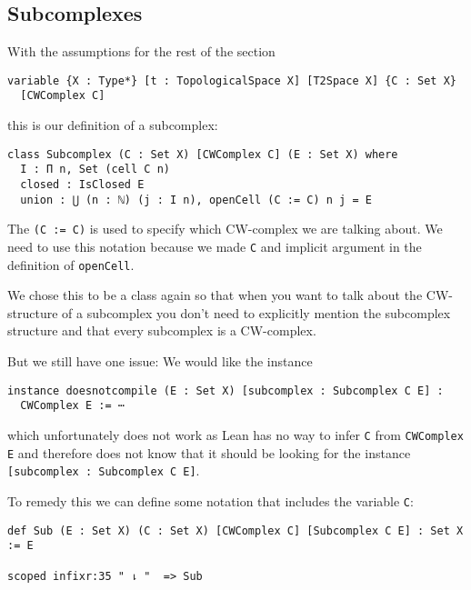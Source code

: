 \subsection{Subcomplexes}

With the assumptions for the rest of the section

\begin{lstlisting}
variable {X : Type*} [t : TopologicalSpace X] [T2Space X] {C : Set X} 
  [CWComplex C]
\end{lstlisting}

this is our definition of a subcomplex:
\href{https://github.com/scholzhannah/CWComplexes/blob/7be4872a05b534011cc969eb5b80a4b7f0bf57e2/CWcomplexes/subcomplex.lean#L44-L52}{\faExternalLink}

\begin{lstlisting}
class Subcomplex (C : Set X) [CWComplex C] (E : Set X) where
  I : Π n, Set (cell C n)
  closed : IsClosed E
  union : ⋃ (n : ℕ) (j : I n), openCell (C := C) n j = E
\end{lstlisting}

The \lstinline{(C := C)} is used to specify which CW-complex we are talking about. 
We need to use this notation because we made \lstinline{C} and implicit argument in the definition of \lstinline{openCell}.

We chose this to be a class again so that when you want to talk about the CW-structure of a subcomplex you don't need to explicitly mention the subcomplex structure and that every subcomplex is a CW-complex.

But we still have one issue: 
We would like the instance 

\begin{lstlisting}
instance doesnotcompile (E : Set X) [subcomplex : Subcomplex C E] : 
  CWComplex E := ⋯ 
\end{lstlisting}

which unfortunately does not work as Lean has no way to infer \lstinline{C} from \lstinline{CWComplex E} and therefore does not know that it should be looking for the instance \lstinline{[subcomplex : Subcomplex C E]}. 

To remedy this we can define some notation that includes the variable \lstinline{C}: 
\href{https://github.com/scholzhannah/CWComplexes/blob/7be4872a05b534011cc969eb5b80a4b7f0bf57e2/CWcomplexes/subcomplex.lean#L110-L115}{\faExternalLink}

\begin{lstlisting}
def Sub (E : Set X) (C : Set X) [CWComplex C] [Subcomplex C E] : Set X := E

scoped infixr:35 " ⇂ "  => Sub
\end{lstlisting}

